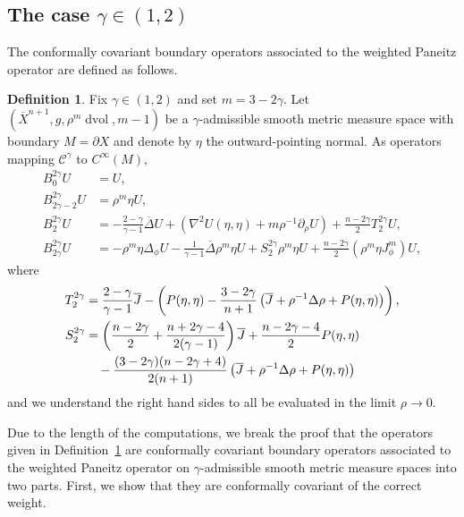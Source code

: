 \documentclass{amsart}
\theoremstyle{definition}
\newtheorem{defn}[thm]{Definition}
\theoremstyle{remark}
\numberwithin{equation}{section}
\begin{document}
\subsection{The case $\gamma\in(1,2)$}
\label{subsec:boundary/2}

The conformally covariant boundary operators associated to the weighted Paneitz operator are defined as follows.

\begin{defn}
 \label{defn:operators}
 Fix $\gamma\in(1,2)$ and set $m=3-2\gamma$.  Let $({\overline{X}}^{n+1},g,\rho^m\operatorname{dvol},m-1)$ be a $\gamma$-admissible smooth metric measure space with boundary $M=\partial X$ and denote by $\eta$ the outward-pointing normal.  As operators mapping ${\mathcal{C}}^\gamma$ to $C^\infty(M)$,
 \begin{align*}
  B_{0}^{2\gamma}U & = U , \\
  B_{2\gamma-2}^{2\gamma}U & = \rho^m\eta U , \\
  B_{2}^{2\gamma}U & = -\frac{2-\gamma}{\gamma-1}{\overline{\Delta}} U + \left(\nabla^2U(\eta,\eta) + m\rho^{-1}\partial_\rho U\right) + \frac{n-2\gamma}{2}T_{2}^{2\gamma}U , \\
  B_{2\gamma}^{2\gamma}U & = -\rho^m\eta\Delta_\phi U - \frac{1}{\gamma-1}{\overline{\Delta}}\rho^m\eta U + S_2^{2\gamma}\rho^m\eta U + \frac{n-2\gamma}{2}\left(\rho^m\eta J_\phi^m\right)U ,
 \end{align*}
 where
 \begin{align}
  \label{eqn:T} T_{2}^{2\gamma} & = \frac{2-\gamma}{\gamma-1}{\overline{J}} - \left(P(\eta,\eta) - \frac{3-2\gamma}{n+1}\left({\overline{J}} + \rho^{-1}\Delta\rho + P(\eta,\eta)\right)\right), \\
  \label{eqn:S} S_2^{2\gamma} & = \left(\frac{n-2\gamma}{2} + \frac{n+2\gamma-4}{2(\gamma-1)}\right){\overline{J}} + \frac{n-2\gamma-4}{2}P(\eta,\eta) \\
  \notag & \quad - \frac{(3-2\gamma)(n-2\gamma+4)}{2(n+1)}\left({\overline{J}} + \rho^{-1}\Delta\rho + P(\eta,\eta)\right)
 \end{align}
 and we understand the right hand sides to all be evaluated in the limit $\rho\to0$.
\end{defn}

Due to the length of the computations, we break the proof that the operators given in Definition~\ref{defn:operators} are conformally covariant boundary operators associated to the weighted Paneitz operator on $\gamma$-admissible smooth metric measure spaces into two parts.  First, we show that they are conformally covariant of the correct weight.
\end{document}

